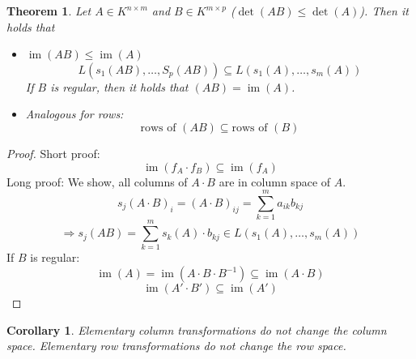 \documentclass[a4paper,landscape,twocolumn]{article}
\newtheorem{theorem}{Theorem}
\newtheorem{cor}{Corollary}
\DeclareMathOperator\image{im} %
\begin{document}
\begin{theorem}
  \label{lemma-6.38}
  Let $A \in K^{n\times m}$ and $B \in K^{m\times p}$ ($\det(AB) \leq \det(A)$).
  Then it holds that
  \begin{itemize}
    \item $\image(AB) \leq \image(A)$
      \[ L(s_1(AB), \ldots, S_p(AB)) \subseteq L(s_1(A), \ldots, s_m(A)) \]
      If $B$ is regular, then it holds that $(AB) = \image(A)$.
    \item Analogous for rows:
      \[ \text{rows of } (AB) \subseteq \text{rows of } (B) \]
  \end{itemize}
\end{theorem}
\begin{proof}
  Short proof:
  \[ \image(f_A \cdot f_B) \subseteq \image(f_A) \]
  Long proof: We show, all columns of $A\cdot B$ are in column space of $A$.
  \[ s_j(A \cdot B)_i = (A\cdot B)_{ij} = \sum_{k=1}^m a_{ik} b_{kj} \]
  \[ \Rightarrow s_j(AB) = \sum_{k=1}^m s_k(A) \cdot b_{kj} \in L(s_1(A), \ldots, s_m(A)) \]
  If $B$ is regular:
  \[ \image(A) = \image(A \cdot B \cdot B^{-1}) \subseteq \image(A \cdot B) \]
  \[ \image(A' \cdot B') \subseteq \image(A') \]
\end{proof}
\begin{cor}
  \label{korollar-6.35}
  Elementary column transformations do not change the column space.
  Elementary row transformations do not change the row space.
\end{cor}
\end{document}
